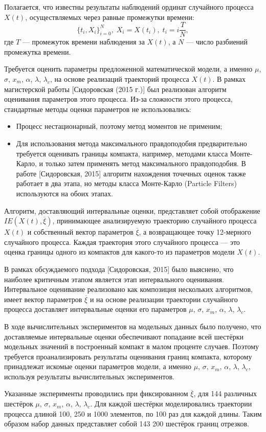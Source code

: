 Полагается, что известны результаты наблюдений ординат случайного процесса $X(t)$, осуществляемых через равные промежутки времени:
\begin{equation}
\{ t_i, X_i \}_{i=0}^N, \; X_i = X(t_i), \; t_i = i\frac{T}{N},
\end{equation}
где
$T$ --- промежуток времени наблюдения за $X(t)$, а $N$ --- число разбиений промежутка времени.

Требуется оценить параметры предложенной математической модели, а именно $\mu$, $\sigma$, $x_m$, $\alpha$, $\lambda$, $\lambda_c$, на основе реализаций траекторий процесса $X(t)$. В рамках магистерской работы [Сидоровская (2015 г.)] был реализован алгоритм оценивания параметров этого процесса. Из-за сложности этого процесса, стандартные методы оценки параметров не использовались:
\begin{itemize}
  \item Процесс нестационарный, поэтому метод моментов не применим;
  \item Для использования метода максимального правдоподобия предварительно требуется оценивать границы компакта, например, методами класса Монте-Карло, и только затем применять метод максимального правдоподобия. В работе [Сидоровская, 2015] алгоритм нахождения точечных оценок также работает в два этапа, но методы класса Монте-Карло (Particle Filters) используются на обоих этапах.
\end{itemize}

Алгоритм, доставляющий интервальные оценки, представляет собой отображение $IE(X(t), \overline{\xi})$, принимающее анализируемую траекторию случайного процесса $X(t)$ и собственный вектор параметров $\overline{\xi}$, а возвращающее точку 12-мерного случайного процесса. Каждая траектория этого случайного процесса ---  это оценка границы одного из компактов для какого-то из параметров модели $X(t)$.

В рамках обсуждаемого подхода [Сидоровская, 2015] было выяснено, что наиболее критичным этапом является этап интервального оценивания. Интервальное оценивание реализовано как композиция нескольких алгоритмов, имеет вектор параметров $\overline{\xi}$ и на основе реализации траектории случайного процесса доставляет интервальные оценки его параметров $\mu$, $\sigma$, $x_m$, $\alpha$, $\lambda$, $\lambda_c$.

В ходе вычислительных экспериментов на модельных данных было получено, что доставляемые интервальные оценки обеспечивают попадание всей шестёрки модельных значений в построенный компакт в малом проценте случаев. Поэтому требуется проанализировать результаты оценивания границ компакта, которому принадлежат искомые оценки параметров модели, а именно $\mu$, $\sigma$, $x_m$, $\alpha$, $\lambda$, $\lambda_c$, используя результаты вычислительных экспериментов.

Указанные эксперименты проводились при фиксированном $\overline{\xi}$, для 144 различных шестёрок $\mu$, $\sigma$, $x_m$, $\alpha$, $\lambda$, $\lambda_c$. Для каждой шестёрки моделировались траектории процесса длиной 100, 250 и 1000 элементов, по 100 раз для каждой длины. Таким образом набор данных представляет собой 143 200 шестёрок границ отрезков.

\clearpage